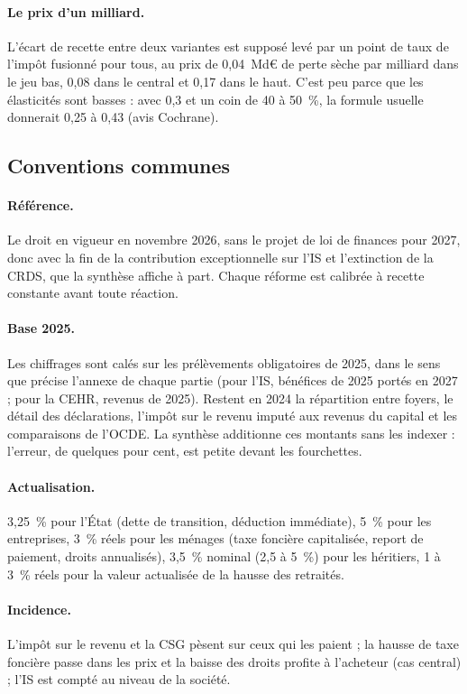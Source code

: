 \paragraph{Le prix d'un milliard.} L'écart de recette entre deux variantes est supposé levé par un point de taux de
l'impôt fusionné pour tous, au prix de 0,04~Md€ de perte sèche par milliard dans le jeu bas, 0,08 dans le central et
0,17 dans le haut. C'est peu parce que les élasticités sont basses : avec 0,3 et un coin de 40 à 50~\%, la formule
usuelle donnerait 0,25 à 0,43 (avis Cochrane).

\subsection{Conventions communes}\label{ann:meth_conv}

\paragraph{Référence.} Le droit en vigueur en novembre 2026, sans le projet de loi de finances pour 2027, donc avec la
fin de la contribution exceptionnelle sur l'IS et l'extinction de la CRDS, que la synthèse affiche à part. Chaque
réforme est calibrée à recette constante avant toute réaction.

\paragraph{Base 2025.} Les chiffrages sont calés sur les prélèvements obligatoires de 2025, dans le sens que précise
l'annexe de chaque partie (pour l'IS, bénéfices de 2025 portés en 2027 ; pour la CEHR, revenus de 2025). Restent en
2024 la répartition entre foyers, le détail des déclarations, l'impôt sur le revenu imputé aux revenus du capital et
les comparaisons de l'OCDE. La synthèse additionne ces montants sans les indexer : l'erreur, de quelques pour cent, est
petite devant les fourchettes.

\paragraph{Actualisation.} 3,25~\% pour l'État (dette de transition, déduction immédiate), 5~\% pour les entreprises,
3~\% réels pour les ménages (taxe foncière capitalisée, report de paiement, droits annualisés), 3,5~\% nominal (2,5 à
5~\%) pour les héritiers, 1 à 3~\% réels pour la valeur actualisée de la hausse des retraités.

\paragraph{Incidence.} L'impôt sur le revenu et la CSG pèsent sur ceux qui les paient ; la hausse de taxe foncière
passe dans les prix et la baisse des droits profite à l'acheteur (cas central) ; l'IS est compté au niveau de la
société.

